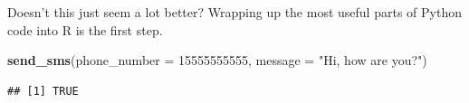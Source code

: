 \documentclass[]{book}
\newenvironment{Shaded}{\begin{snugshade}}{\end{snugshade}}
\newcommand{\DataTypeTok}[1]{\textcolor[rgb]{0.13,0.29,0.53}{#1}}
\newcommand{\DecValTok}[1]{\textcolor[rgb]{0.00,0.00,0.81}{#1}}
\newcommand{\KeywordTok}[1]{\textcolor[rgb]{0.13,0.29,0.53}{\textbf{#1}}}
\newcommand{\NormalTok}[1]{#1}
\newcommand{\StringTok}[1]{\textcolor[rgb]{0.31,0.60,0.02}{#1}}
\begin{document}
Doesn't this just seem a lot better? Wrapping up the most useful parts of Python code into R is the first step.

\begin{Shaded}
\begin{Highlighting}[]
\KeywordTok{send_sms}\NormalTok{(}\DataTypeTok{phone_number =} \DecValTok{15555555555}\NormalTok{, }\DataTypeTok{message =} \StringTok{"Hi, how are you?"}\NormalTok{)}
\end{Highlighting}
\end{Shaded}

\begin{verbatim}
## [1] TRUE
\end{verbatim}


\end{document}
